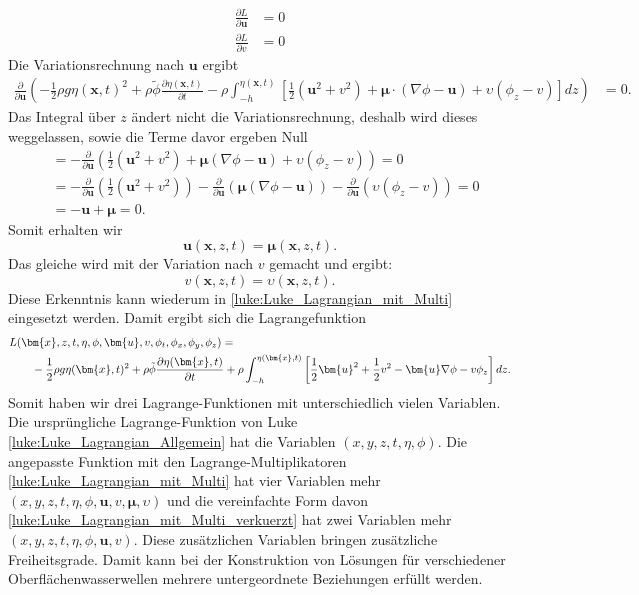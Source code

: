 \begin{align*}
\frac{\partial L}{\partial \bm{u}} &= 0
\\
\frac{\partial L}{\partial v} &= 0
\end{align*}
Die Variationsrechnung nach $\bm{u}$ ergibt
\begin{align*}
	\frac{\partial \mathscr{}}{\partial \bm{u}}\left( -\frac{1}{2} \rho g \eta(\bm{x},t)^2 + \rho\tilde{\phi} \frac{\partial\eta(\bm{x},t)}{\partial t} -\rho \int_{-h}^{\eta(\bm{x},t)} \left[ \frac{1}{2} (\bm{u}^2 + v^2) + \bm{\mu} \cdot (\nabla\phi - \bm{u}) + \upsilon \left(\phi_z - v\right) \right] dz\right)
	&= 0.
\end{align*}
Das Integral über $z$ ändert nicht die Variationsrechnung, deshalb wird dieses weggelassen, sowie die Terme davor ergeben Null
\begin{align*}
	&= -\frac{\partial}{\partial \bm{u}} \left(\frac{1}{2} (\bm{u}^2 + v^2) + \bm{\mu} (\nabla\phi - \bm{u}) + \upsilon \left(\phi_z - v\right) \right) = 0
	\\
	&= -\frac{\partial}{\partial \bm{u}} \left( \frac{1}{2} (\bm{u}^2 + v^2) \right)  -\frac{\partial}{\partial \bm{u}} \left( \bm{\mu} (\nabla\phi - \bm{u}) \right)  -\frac{\partial}{\partial \bm{u}} \left( \upsilon \left(\phi_z - v\right) \right) = 0
	\\
	&=
	-\bm{u}
	+\bm{\mu}
	= 0.
\end{align*}
Somit erhalten wir
\begin{equation}
	\bm{u}(\bm{x},z,t) = \bm{\mu}(\bm{x},z,t).
\end{equation}
Das gleiche wird mit der Variation nach $v$ gemacht und ergibt:
\begin{equation}
	v(\bm{x},z,t) = \upsilon(\bm{x},z,t).
\end{equation}
Diese Erkenntnis kann wiederum in \eqref{luke:Luke_Lagrangian_mit_Multi} eingesetzt werden.
Damit ergibt sich die Lagrangefunktion
\begin{align}
&L(\bm{x},z,t,\eta,\phi,\bm{u}, v,\phi_t,\phi_x, \phi_y, \phi_z)
=
\notag
\\
&\qquad
	-
	\frac{1}{2}\rho g \eta(\bm{x},t)^2
	+
	\rho\tilde{\phi} \frac{\partial\eta(\bm{x},t)}{\partial t}
	+
	\rho\int_{-h}^{\eta(\bm{x},t)} \left[ \frac{1}{2} \bm{u}^2 + \frac{1}{2} v^2 - \bm{u} \nabla \phi - v \phi_z \right] dz.
	\label{luke:Luke_Lagrangian_mit_Multi_verkuerzt}
\end{align}
Somit haben wir drei Lagrange-Funktionen mit unterschiedlich vielen Variablen.
Die ursprüngliche Lagrange-Funktion von Luke \eqref{luke:Luke_Lagrangian_Allgemein} hat die Variablen $(x,y,z,t,\eta,\phi)$.
Die angepasste Funktion mit den Lagrange-Multiplikatoren \eqref{luke:Luke_Lagrangian_mit_Multi} hat vier Variablen mehr $(x,y,z,t,\eta,\phi,\bm{u},v,\bm{\mu},\upsilon)$ und die vereinfachte Form davon \eqref{luke:Luke_Lagrangian_mit_Multi_verkuerzt} hat zwei Variablen mehr $(x,y,z,t,\eta,\phi,\bm{u},v)$.
Diese zusätzlichen Variablen bringen zusätzliche Freiheitsgrade.
Damit kann bei der Konstruktion von Lösungen für verschiedener Oberflächenwasserwellen mehrere untergeordnete Beziehungen erfüllt werden.

